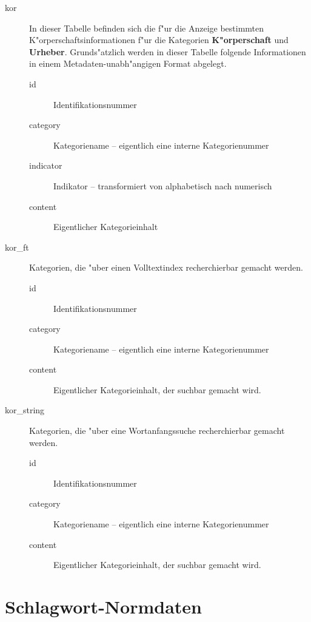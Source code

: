\documentclass[11pt, twoside, a4paper, BCOR8mm, DIV12, bibtotoc,idxtotoc]{scrbook}
\begin{document}
\begin{description}
\item[kor] In dieser Tabelle befinden sich die f"ur die Anzeige
  bestimmten K"orperschaftsinformationen f"ur die Kategorien
  \textbf{K"orperschaft} und \textbf{Urheber}. Grunds"atzlich werden in
  dieser Tabelle folgende Informationen in einem
  Metadaten-unabh"angigen Format abgelegt.
  \begin{description}
  \item[id] Identifikationsnummer
  \item[category] Kategoriename -- eigentlich eine interne Kategorienummer
  \item[indicator] Indikator -- transformiert von alphabetisch nach numerisch
  \item[content] Eigentlicher Kategorieinhalt
  \end{description}
\item[kor\_ft] Kategorien, die "uber einen Volltextindex recherchierbar
  gemacht werden.
  \begin{description}
  \item[id] Identifikationsnummer
  \item[category] Kategoriename -- eigentlich eine interne Kategorienummer
  \item[content] Eigentlicher Kategorieinhalt, der suchbar gemacht wird.
  \end{description}
\item[kor\_string] Kategorien, die "uber eine Wortanfangssuche
  recherchierbar gemacht werden.
  \begin{description}
  \item[id] Identifikationsnummer
  \item[category] Kategoriename -- eigentlich eine interne Kategorienummer
  \item[content] Eigentlicher Kategorieinhalt, der suchbar gemacht wird.
  \end{description}
\end{description}

\section{Schlagwort-Normdaten}
\end{document}
